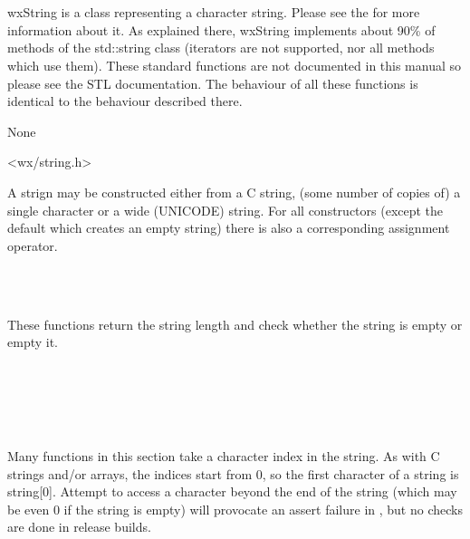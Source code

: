 \section{}\label{wxstring}

wxString is a class representing a character string. Please see the 
 for more information about it. As explained
there, wxString implements about 90\% of methods of the std::string class (iterators
are not supported, nor all methods which use them).
These standard functions are not documented in this manual so please see the STL documentation.
The behaviour of all these functions is identical to the behaviour described
there.


None


<wx/string.h>





A strign may be constructed either from a C string, (some number of copies of)
a single character or a wide (UNICODE) string. For all constructors (except the
default which creates an empty string) there is also a corresponding assignment
operator.

\\
\\


These functions return the string length and check whether the string is empty
or empty it.

\\
\\
\\
\\


Many functions in this section take a character index in the string. As with C
strings and/or arrays, the indices start from $0$, so the first character of a
string is string[$0$]. Attempt to access a character beyond the end of the
string (which may be even $0$ if the string is empty) will provocate an assert
failure in , but no checks are done in
release builds.

